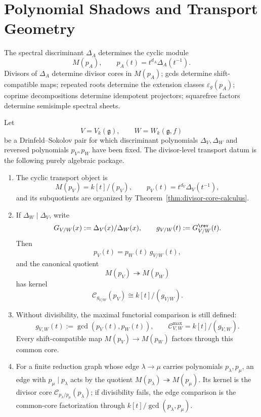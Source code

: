 \section{Polynomial Shadows and Transport Geometry}

The spectral discriminant \(\Delta_A\) determines the cyclic module
\[
M(p_A),\qquad p_A(t)=t^{d_A}\Delta_A(t^{-1}).
\]
Divisors of \(\Delta_A\) determine divisor cores in \(M(p_A)\); gcds
determine shift-compatible maps; repeated roots determine the extension
classes \(\varepsilon_g(p_A)\); coprime decompositions determine idempotent
projectors; squarefree factors determine semisimple spectral sheets.

\begin{construction}
\label{constr:casimir-divisor-shadow}
Let
\[
V=V_k(\mathfrak g),\qquad W=W_k(\mathfrak g,f)
\]
be a Drinfeld--Sokolov pair for which discriminant polynomials
\(\Delta_V,\Delta_W\) and reversed polynomials \(p_V,p_W\) have been fixed.
The divisor-level transport datum is the following purely algebraic package.
\begin{enumerate}[label=\textup{(\roman*)}]
\item The cyclic transport object is
\[
M(p_V)=k[t]/(p_V),\qquad p_V(t)=t^{d_V}\Delta_V(t^{-1}),
\]
and its subquotients are organized by Theorem~\ref{thm:divisor-core-calculus}.

\item If \(\Delta_W\mid\Delta_V\), write
\[
G_{V/W}(x):=\Delta_V(x)/\Delta_W(x),
\qquad
g_{V/W}(t):=G_{V/W}^{\rev}(t).
\]
Then
\[
p_V(t)=p_W(t)\,g_{V/W}(t),
\]
and the canonical quotient
\[
M(p_V)\twoheadrightarrow M(p_W)
\]
has kernel
\[
\mathcal C_{g_{V/W}}(p_V)\cong k[t]/(g_{V/W}).
\]

\item Without divisibility, the maximal functorial comparison is still defined:
\[
g_{V,W}(t):=\gcd(p_V(t),p_W(t)),\qquad
\mathcal C^{\max}_{V,W}=k[t]/(g_{V,W}).
\]
Every shift-compatible map \(M(p_V)\to M(p_W)\) factors through this common core.

\item For a finite reduction graph whose edge \(\lambda\to\mu\) carries
polynomials \(p_\lambda,p_\mu\), an edge with \(p_\mu\mid p_\lambda\)
acts by the quotient \(M(p_\lambda)\twoheadrightarrow M(p_\mu)\).
Its kernel is the divisor core \(\mathcal C_{p_\lambda/p_\mu}(p_\lambda)\);
if divisibility fails, the edge comparison is the common-core factorization
through \(k[t]/\gcd(p_\lambda,p_\mu)\).
\end{enumerate}
\end{construction}
